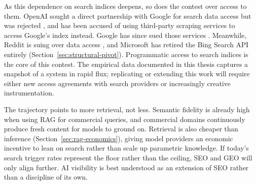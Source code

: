 As this dependence on search indices deepens, so does the contest
over access to them. OpenAI sought a direct partnership with Google
for search data access but was rejected
\parencite{techwireasia2025chrome}, and has been accused of using
third-party scraping services to access Google's index instead.
Google has since sued those services
\parencite{google2025serpapi}. Meanwhile, Reddit is suing over
data access \parencite{reddit2025perplexity}, and Microsoft has
retired the Bing Search API entirely
(Section~\ref{sec:structural-pivot}). Programmatic access to search indices is the core of this contest. The empirical data documented in
this thesis captures a snapshot of a system in rapid flux;
replicating or extending this work will require either new access
agreements with search providers or increasingly creative
instrumentation.

The trajectory points to more retrieval, not less. Semantic fidelity
is already high when using RAG for commercial queries, and commercial
domains continuously produce fresh content for models to ground on.
Retrieval is also cheaper than inference
(Section~\ref{sec:rag-economics}), giving model providers an
economic incentive to lean on search rather than scale up parametric
knowledge.
If today's search trigger rates represent the floor rather than the
ceiling, SEO and GEO will only align further. AI visibility is best understood as an extension of
SEO rather than a discipline of its own.
